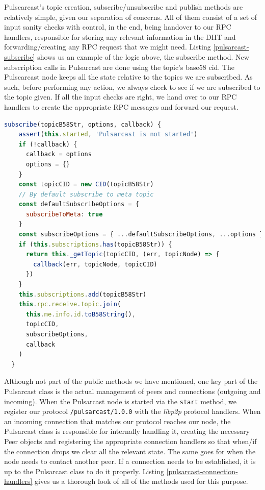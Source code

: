Pulscarcast's topic creation, subscribe/unsubscribe and publish methods are
relatively simple, given our separation of concerns. All of them consist of a
set of input sanity checks with control, in the end, being handover to our RPC
handlers, responsible for storing any relevant information in the DHT and
forwarding/creating any RPC request that we might need. Listing
\ref{pulsarcast-subscribe} shows us an example of the logic above, the
subscribe method. New subscription calls in Pulsarcast are done using the
topic's base58 \acrshort{cid}. The Pulscarcast node keeps all the state relative to the
topics we are subscribed. As such, before performing any action, we always
check to see if we are subscribed to the topic given. If all the input checks
are right, we hand over to our RPC handlers to create the appropriate RPC
messages and forward our request.

\begin{lstlisting}[language=JavaScript, float, caption={Pulsarcast class subscribe method},label={pulsarcast-subscribe}]
  subscribe(topicB58Str, options, callback) {
    assert(this.started, 'Pulsarcast is not started')
    if (!callback) {
      callback = options
      options = {}
    }
    const topicCID = new CID(topicB58Str)
    // By default subscribe to meta topic
    const defaultSubscribeOptions = {
      subscribeToMeta: true
    }
    const subscribeOptions = { ...defaultSubscribeOptions, ...options }
    if (this.subscriptions.has(topicB58Str)) {
      return this._getTopic(topicCID, (err, topicNode) => {
        callback(err, topicNode, topicCID)
      })
    }
    this.subscriptions.add(topicB58Str)
    this.rpc.receive.topic.join(
      this.me.info.id.toB58String(),
      topicCID,
      subscribeOptions,
      callback
    )
  }
\end{lstlisting}

Although not part of the public methods we have mentioned, one key part of the
Pulsarcast class is the actual management of peers and connections (outgoing
and incoming). When the Pulsarcast node is started via the \verb|start| method,
we register our protocol \verb|/pulsarcast/1.0.0| with the \emph{libp2p}
protocol handlers. When an incoming connection that matches our protocol
reaches our node, the Pulsarcast class is responsible for internally handling
it, creating the necessary Peer objects and registering the appropriate
connection handlers so that when/if the connection drops we clear all the
relevant state. The same goes for when the node needs to contact another peer.
If a connection needs to be established, it is up to the Pulsarcast class to do
it properly. Listing \ref{pulsarcast-connection-handlers} gives us a thorough
look of all of the methods used for this purpose.

